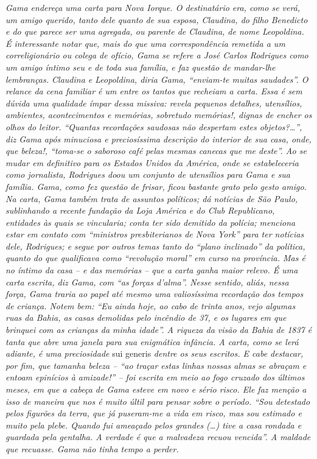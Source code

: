 \begin{didascalia}
\emph{Gama endereça uma carta para Nova Iorque. O destinatário era, como
se verá, um amigo querido, tanto dele quanto de sua esposa, Claudina, do
filho Benedicto e do que parece ser uma agregada, ou parente de
Claudina, de nome Leopoldina. É interessante notar que, mais do que uma
correspondência remetida a um correligionário ou colega de ofício, Gama
se refere a José Carlos Rodrigues como um amigo íntimo seu e de toda sua
família, e faz questão de mandar-lhe lembranças. Claudina e Leopoldina,
diria Gama, ``enviam-te muitas saudades''. O relance da cena familiar é um
entre os tantos que recheiam a carta. Essa é sem dúvida uma qualidade
ímpar dessa missiva: revela pequenos detalhes, utensílios, ambientes,
acontecimentos e memórias, sobretudo memórias!, dignas de encher os
olhos do leitor. ``Quantas recordações saudosas não despertam estes
objetos?\ldots{}'', diz Gama após minuciosa e preciosíssima descrição do
interior de sua casa, onde, que beleza!, ``toma-se o saboroso café pelas
mesmas canecas que me deste''. Ao se mudar em definitivo para os Estados
Unidos da América, onde se estabeleceria como jornalista, Rodrigues doou
um conjunto de utensílios para Gama e sua família. Gama, como fez
questão de frisar, ficou bastante grato pelo gesto amigo. Na carta, Gama
também trata de assuntos políticos; dá notícias de São Paulo,
sublinhando a recente fundação da Loja América e do Club Republicano,
entidades às quais se vincularia; conta ter sido demitido da polícia;
menciona estar em contato com ``ministros presbiterianos de Nova York''
para ter notícias dele, Rodrigues; e segue por outros temas tanto do
``plano inclinado'' da política, quanto do que qualificava como ``revolução
moral'' em curso na província. Mas é no íntimo da casa -- e das memórias
-- que a carta ganha maior relevo. É uma carta escrita, diz Gama, com
``as forças d'alma''. Nesse sentido, aliás, nessa força, Gama traria ao
papel até mesmo uma valiosíssima recordação dos tempos de criança. Notem
bem: ``Eu ainda hoje, ao cabo de trinta anos, vejo algumas ruas da Bahia,
as casas demolidas pelo incêndio de 37, e os lugares em que brinquei com
as crianças da minha idade''. A riqueza da visão da Bahia de 1837 é tanta
que abre uma janela para sua enigmática infância. A carta, como se lerá
adiante, é uma preciosidade} sui generis \emph{dentre os seus escritos.
E cabe destacar, por fim, que tamanha beleza -- ``ao traçar estas linhas
nossas almas se abraçam e entoam epinícios à amizade!'' -- foi escrita em
meio ao fogo cruzado dos últimos meses, em que a cabeça de Gama esteve
em novo e sério risco. Ele faz menção a isso de maneira que nos é muito
últil para pensar sobre o período. ``Sou detestado pelos figurões da
terra, que já puseram-me a vida em risco, mas sou estimado e muito pela
plebe. Quando fui ameaçado pelos grandes (\ldots{}) tive a casa rondada e
guardada pela gentalha. A verdade é que a malvadeza recuou vencida''. A
maldade que recuasse. Gama não tinha tempo a perder.}
\end{didascalia}



